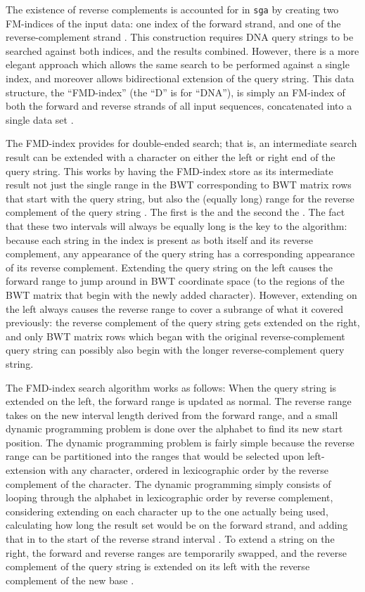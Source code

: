The existence of reverse complements is accounted for in \texttt{sga} by creating two FM-indices of the input data: one index of the forward strand, and one of the reverse-complement strand \cite{simpson2012efficient}. This construction requires DNA query strings to be searched against both indices, and the results combined. However, there is a more elegant approach which allows the same search to be performed against a single index, and moreover allows bidirectional extension of the query string. This data structure, the ``FMD-index'' (the ``D'' is for ``DNA''), is simply an FM-index of both the forward and reverse strands of all input sequences, concatenated into a single data set \cite{li2012exploring}.

The FMD-index provides for double-ended search; that is, an intermediate search result can be extended with a character on either the left or right end of the query string. This works by having the FMD-index store as its intermediate result not just the single range in the BWT corresponding to BWT matrix rows that start with the query string, but also the (equally long) range for the reverse complement of the query string \cite{li2012exploring}. The first is the  and the second the . The fact that these two intervals will always be equally long is the key to the algorithm: because each string in the index is present as both itself and its reverse complement, any appearance of the query string has a corresponding appearance of its reverse complement. Extending the query string on the left causes the forward range to jump around in BWT coordinate space (to the regions of the BWT matrix that begin with the newly added character). However, extending on the left always causes the reverse range to cover a subrange of what it covered previously: the reverse complement of the query string gets extended on the right, and only BWT matrix rows which began with the original reverse-complement query string can possibly also begin with the longer reverse-complement query string.

The FMD-index search algorithm works as follows: When the query string is extended on the left, the forward range is updated as normal. The reverse range takes on the new interval length derived from the forward range, and a small dynamic programming problem is done over the alphabet to find its new start position. The dynamic programming problem is fairly simple because the reverse range can be partitioned into the ranges that would be selected upon left-extension with any character, ordered in lexicographic order by the reverse complement of the character. The dynamic programming simply consists of looping through the alphabet in lexicographic order by reverse complement, considering extending on each character up to the one actually being used, calculating how long the result set would be on the forward strand, and adding that in to the start of the reverse strand interval \cite{li2012exploring}. To extend a string on the right, the forward and reverse ranges are temporarily swapped, and the reverse complement of the query string is extended on its left with the reverse complement of the new base \cite{li2012exploring}.

